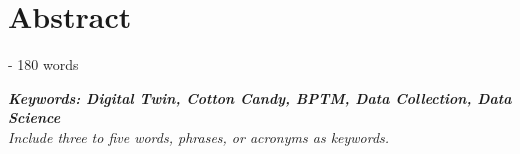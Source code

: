 \chapter*{Abstract}
 - 180 words 


\textit{\textbf{Keywords: Digital Twin, Cotton Candy, BPTM, Data Collection, Data Science} \\Include three to five words, phrases, or acronyms as keywords.}
